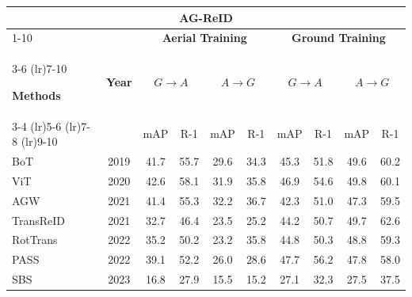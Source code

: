\documentclass[border=4pt]{standalone}
\begin{document}
\scriptsize
\setlength{\tabcolsep}{6pt}
\begin{tabular}{l c cccc cccc}
            \toprule
            \multicolumn{10}{c}{\textbf{AG-ReID}} \\

            \cmidrule(lr){1-10}

            &
            & \multicolumn{4}{c}{\textbf{Aerial Training}}
            & \multicolumn{4}{c}{\textbf{Ground Training}} \\

            \cmidrule(lr){3-6} \cmidrule(lr){7-10}

            \textbf{Methods} & \textbf{Year}
            & \multicolumn{2}{c}{$G \rightarrow A$}
            & \multicolumn{2}{c}{$A \rightarrow G$}
            & \multicolumn{2}{c}{$G \rightarrow A$}
            & \multicolumn{2}{c}{$A \rightarrow G$} \\

            \cmidrule(lr){3-4} \cmidrule(lr){5-6} \cmidrule(lr){7-8} \cmidrule(lr){9-10}

            & & mAP & R-1 & mAP & R-1
            & mAP & R-1 & mAP & R-1 \\
            \midrule

            BoT & 2019
            & 41.7 & 55.7 & 29.6 & 34.3
            & 45.3 & 51.8 & 49.6 & 60.2 \\

            ViT & 2020
            & 42.6 & 58.1 & 31.9 & 35.8
            & 46.9 & 54.6 & 49.8 & 60.1 \\

            AGW & 2021
            & 41.4 & 55.3 & 32.2 & 36.7
            & 42.3 & 51.0 & 47.3 & 59.5 \\

            TransReID & 2021
            & 32.7 & 46.4 & 23.5 & 25.2
            & 44.2 & 50.7 & 49.7 & 62.6 \\

            RotTrans & 2022
            & 35.2 & 50.2 & 23.2 & 35.8
            & 44.8 & 50.3 & 48.8 & 59.3 \\

            PASS & 2022
            & 39.1 & 52.2 & 26.0 & 28.6
            & 47.7 & 56.2 & 47.8 & 58.0 \\

            SBS & 2023
            & 16.8 & 27.9 & 15.5 & 15.2
            & 27.1 & 32.3 & 27.5 & 37.5 \\


\end{tabular}
\end{document}
